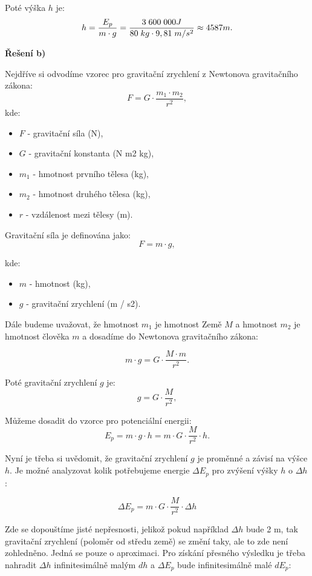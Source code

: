 \documentclass{article}
\begin{document}
Poté výška $h$ je:
$$
    h = \frac{E_p}{m \cdot g} = \frac{3 \; 600 \; 000 J}{80 \; kg \cdot 9,81 \; m/s^2} \approx 4 587 m.
$$

\textbf{Řešení b)}

Nejdříve si odvodíme vzorec pro gravitační zrychlení z Newtonova gravitačního zákona:
$$
    F = G \cdot \frac{m_1 \cdot m_2}{r^2},
$$
kde:
\begin{itemize}
    \item $F$ - gravitační síla (N),
    \item $G$ - gravitační konstanta (N \myFS m2 \myFS kg),
    \item $m_1$ - hmotnost prvního tělesa (kg),
    \item $m_2$ - hmotnost druhého tělesa (kg),
    \item $r$ - vzdálenost mezi tělesy (m).
\end{itemize}

Gravitační síla je definována jako:
$$
    F = m \cdot g,
$$

kde:
\begin{itemize}
    \item $m$ - hmotnost (kg),
    \item $g$ - gravitační zrychlení (m / s2).
\end{itemize}

Dále budeme uvažovat, že hmotnost $m_1$ je hmotnost Země $M$ a hmotnost $m_2$ je hmotnost člověka $m$ a dosadíme do Newtonova gravitačního zákona:

$$
    m \cdot g = G \cdot \frac{M \cdot m}{r^2}.
$$

Poté gravitační zrychlení $g$ je:
$$
    g = G \cdot \frac{M}{r^2},
$$

Můžeme dosadit do vzorce pro potenciální energii:
$$
    E_p = m \cdot g \cdot h = m \cdot G \cdot \frac{M}{r^2} \cdot h.
$$

Nyní je třeba si uvědomit, že gravitační zrychlení $g$ je proměnné a závisí na výšce $h$. Je možné analyzovat kolik potřebujeme energie $\Delta E_p$ pro zvýšení výšky $h$ o $\Delta h$:

$$
    \Delta E_p = m \cdot G \cdot \frac{M}{r^2} \cdot \Delta h
$$

Zde se dopouštíme jisté nepřesnosti, jelikož pokud například $\Delta h$ bude 2 m, tak gravitační zrychlení (poloměr od středu země) se změní taky, ale to zde není zohledněno. Jedná se pouze o aproximaci. Pro získání přesného výsledku je třeba nahradit $\Delta h$ infinitesimálně malým $dh$ a $\Delta E_p$ bude infinitesimálně malé $dE_p$:
\end{document}
